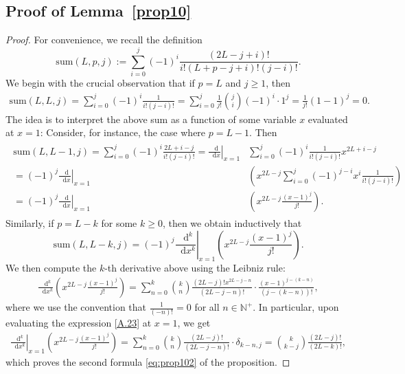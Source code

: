 \documentclass[11pt,english]{article}
\numberwithin{equation}{section}
\theoremstyle{remark}
\theoremstyle{plain}
\theoremstyle{remark}
\newcommand{\dd}{\mathop{}\!\mathrm{d}}
\renewcommand{\(}{\left(}
\renewcommand{\)}{\right)}
\begin{document}
\subsection{Proof of Lemma~\ref{prop10}}\label{A5}
\begin{proof}
For convenience, we recall the definition 
\begin{equation}
\mathrm{sum}(L,p,j):=\sum_{i=0}^j (-1)^{i} \frac{(2L-j+i)!}{i!(L+p-j+i)!(j-i)!}.
\end{equation}
We begin with the crucial observation that if $p=L$ and $j\geq 1$, 
then
\begin{align}
\mathrm{sum}(L,L,j)=\sum_{i=0}^j (-1)^{i} \frac{1}{i!(j-i)!}
=\sum_{i=0}^j\frac{1}{j!}\binom{j}{i}(-1)^i\cdot1^j=\frac{1}{j!}(1-1)^j=0.
\end{align}
The idea is to interpret the above sum as a function of some variable $x$ evaluated at $x=1$: Consider, for instance, the case where $p=L-1$. Then
\begin{align}
\begin{split}
\mathrm{sum}(L,L-1,j)=\sum_{i=0}^j (-1)^i\frac{2L+i-j}{i!(j-i)!}
=\left.\frac{\dd}{\dd x}\right|_{x=1}&\sum_{i=0}^j  (-1)^i\frac{1}{i!(j-i)!}x^{2L+i-j}\\
=(-1)^j\left.\frac{\dd}{\dd x}\right|_{x=1}&\left(x^{2L-j}\sum_{i=0}^j  (-1)^{j-i}x^i\frac{1}{i!(j-i)!}\right)\\
=(-1)^j\left.\frac{\dd}{\dd x}\right|_{x=1}&\left(x^{2L-j}\frac{(x-1)^j}{j!}\right).
\end{split}
\end{align}
Similarly, if $p=L-k$ for some $k\geq 0$, then we obtain inductively that
\begin{equation}
\mathrm{sum}(L,L-k,j)=(-1)^j\left.\frac{\dd^k}{\dd x^k}\right|_{x=1}\left(x^{2L-j}\frac{(x-1)^j}{j!}\right).
\end{equation}
We then compute the $k$-th derivative above using the Leibniz rule:
\begin{align}\label{A.23}
\frac{\dd^k}{\dd x^k}\left(x^{2L-j}\frac{(x-1)^j}{j!}\right)=\sum_{n=0}^k \binom{k}{n}\frac{(2L-j)!x^{2L-j-n}}{(2L-j-n)!}\cdot \frac{(x-1)^{j-(k-n)}}{(j-(k-n))!},
\end{align}
where we use the convention that $\frac{1}{(-n)!}=0$ for all $n\in\mathbb N^+$. In particular, upon evaluating the expression \eqref{A.23} at $x=1$, we get
\begin{align}
\left.\frac{\dd^k}{\dd x^k}\right|_{x=1}\left(x^{2L-j}\frac{(x-1)^j}{j!}\right)=\sum_{n=0}^k \binom{k}{n}\frac{(2L-j)!}{(2L-j-n)!}\cdot \delta_{k-n,j}=\binom{k}{k-j}\frac{(2L-j)!}{(2L-k)!},
\end{align}
 which proves the second formula \eqref{eq:prop102} of the proposition.



\end{proof}
\end{document}
